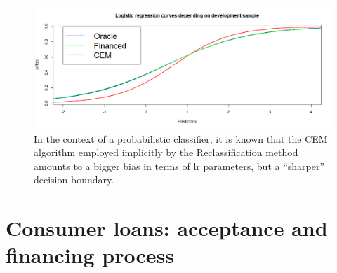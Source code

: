 \begin{figure}[ht]
\center \includegraphics[width=\textwidth]{figures/chapitre2/CEM_bias.png}
\caption{In the context of a probabilistic classifier, it is known that the CEM algorithm employed implicitly by the Reclassification method amounts to a bigger bias in terms of \gls{lr} parameters, but a ``sharper'' decision boundary.}
\label{fig:biais_CEM}
\end{figure}





\section{Consumer loans: acceptance and financing process}




















\printbibliography[heading=subbibliography, title=References of Chapter 2]